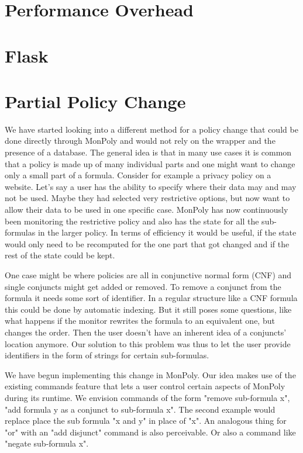 \section{Performance Overhead}

\section{Flask}

\section{Partial Policy Change}

We have started looking into a different method for a policy change that could be done directly through MonPoly and would not rely on the wrapper and the presence of a database.
The general idea is that in many use cases it is common that a policy is made up of many individual parts and one might want to change only a small part of a formula.
Consider for example a privacy policy on a website.
Let's say a user has the ability to specify where their data may and may not be used.
Maybe they had selected very restrictive options, but now want to allow their data to be used in one specific case.
MonPoly has now continuously been monitoring the restrictive policy and also has the state for all the sub-formulas in the larger policy.
In terms of efficiency it would be useful, if the state would only need to be recomputed for the one part that got changed and if the rest of the state could be kept.

One case might be where policies are all in conjunctive normal form (CNF) and single conjuncts might get added or removed.
To remove a conjunct from the formula it needs some sort of identifier.
In a regular structure like a CNF formula this could be done by automatic indexing.
But it still poses some questions, like what happens if the monitor rewrites the formula to an equivalent one, but changes the order.
Then the user doesn't have an inherent idea of a conjuncts' location anymore.
Our solution to this problem was thus to let the user provide identifiers in the form of strings for certain sub-formulas.

We have begun implementing this change in MonPoly.
Our idea makes use of the existing commands feature that lets a user control certain aspects of MonPoly during its runtime.
We envision commands of the form "remove sub-formula x", "add formula y as a conjunct to sub-formula x".
The second example would replace place the sub formula "x and y" in place of "x".
An analogous thing for "or" with an "add disjunct" command is also perceivable.
Or also a command like "negate sub-formula x".

